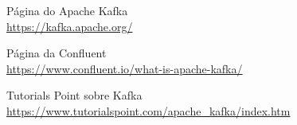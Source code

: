 \documentclass[a4paper,11pt]{article}
\begin{document}


\begin{thebibliography}{4}
	Página do Apache Kafka \\
	\url{https://kafka.apache.org/}

	Página da Confluent \\
	\url{https://www.confluent.io/what-is-apache-kafka/}
	
	Tutorials Point sobre Kafka \\
	\url{https://www.tutorialspoint.com/apache_kafka/index.htm}	
	
	
\end{thebibliography}
\end{document}
